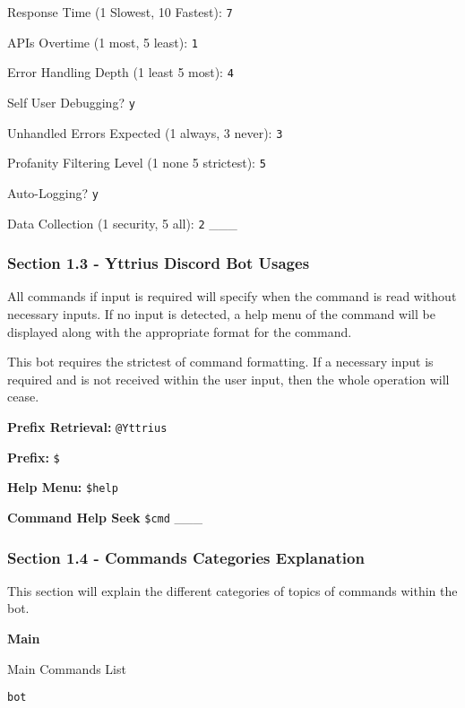Response Time (1 Slowest, 10 Fastest): \texttt{7}

APIs Overtime (1 most, 5 least): \texttt{1}

Error Handling Depth (1 least 5 most): \texttt{4}

Self User Debugging? \texttt{y}

Unhandled Errors Expected (1 always, 3 never): \texttt{3}

Profanity Filtering Level (1 none 5 strictest): \texttt{5}

Auto-Logging? \texttt{y}

Data Collection (1 security, 5 all): \texttt{2} \_\_\_

\hypertarget{section-1.3---yttrius-discord-bot-usages}{%
\subsubsection{Section 1.3 - Yttrius Discord Bot
Usages}\label{section-1.3---yttrius-discord-bot-usages}}

All commands if input is required will specify when the command is read
without necessary inputs. If no input is detected, a help menu of the
command will be displayed along with the appropriate format for the
command.

This bot requires the strictest of command formatting. If a necessary
input is required and is not received within the user input, then the
whole operation will cease.

\textbf{Prefix Retrieval:} \texttt{@Yttrius}

\textbf{Prefix:} \texttt{\$}

\textbf{Help Menu:} \texttt{\$help}

\textbf{Command Help Seek} \texttt{\$cmd} \_\_\_

\hypertarget{section-1.4---commands-categories-explanation}{%
\subsubsection{Section 1.4 - Commands Categories
Explanation}\label{section-1.4---commands-categories-explanation}}

This section will explain the different categories of topics of commands
within the bot.

\textbf{Main}

Main Commands List

\texttt{bot}
